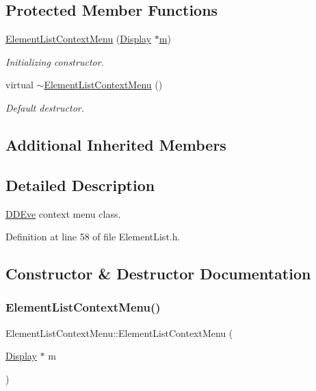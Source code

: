 \subsection*{Protected Member Functions}
\begin{DoxyCompactItemize}
\item 
\hyperlink{class_d_d4hep_1_1_element_list_context_menu_a4966940ed6af2cd74f03ed3c9dec2eb0}{Element\+List\+Context\+Menu} (\hyperlink{class_d_d4hep_1_1_display}{Display} $\ast$\hyperlink{_volumes_8cpp_a6fc379aaec47ce424b00d8ffda2a6c59}{m})
\begin{DoxyCompactList}\small\item\em Initializing constructor. \end{DoxyCompactList}\item 
virtual \hyperlink{class_d_d4hep_1_1_element_list_context_menu_afb7e217c0f5eeeb14ab40b6e375bae39}{$\sim$\+Element\+List\+Context\+Menu} ()
\begin{DoxyCompactList}\small\item\em Default destructor. \end{DoxyCompactList}\end{DoxyCompactItemize}
\subsection*{Additional Inherited Members}


\subsection{Detailed Description}
\hyperlink{struct_d_d4hep_1_1_d_d_eve}{D\+D\+Eve} context menu class. 

Definition at line 58 of file Element\+List.\+h.



\subsection{Constructor \& Destructor Documentation}
\hypertarget{class_d_d4hep_1_1_element_list_context_menu_a4966940ed6af2cd74f03ed3c9dec2eb0}{}\label{class_d_d4hep_1_1_element_list_context_menu_a4966940ed6af2cd74f03ed3c9dec2eb0} 
\subsubsection{\texorpdfstring{Element\+List\+Context\+Menu()}{ElementListContextMenu()}}
{\footnotesize\ttfamily Element\+List\+Context\+Menu\+::\+Element\+List\+Context\+Menu (\begin{DoxyParamCaption}\item[{\hyperlink{class_d_d4hep_1_1_display}{Display} $\ast$}]{m }\end{DoxyParamCaption})\hspace{0.3cm}{\ttfamily [protected]}}




